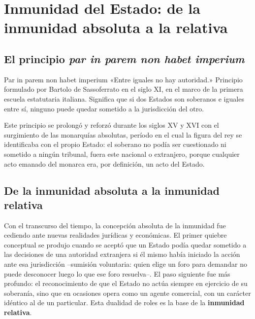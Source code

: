 \documentclass[12pt,oneside]{book}
\renewcommand{\chaptermark}[1]{\markboth{\thechapter.\ #1}{}}
\begin{document}
\chapter{Inmunidad del Estado: de la inmunidad absoluta a la relativa}
\chaptermark{Inmunidad del Estado}

\section{El principio \emph{par in parem non habet imperium}}

\begin{definicion}{Par in parem non habet imperium}
«Entre iguales no hay autoridad.» Principio formulado por Bartolo de Sassoferrato en el siglo XI, en el marco de la primera escuela estatutaria italiana. Significa que si dos Estados son soberanos e iguales entre sí, ninguno puede quedar sometido a la jurisdicción del otro.
\end{definicion}

Este principio se prolongó y reforzó durante los siglos XV y XVI con el surgimiento de las monarquías absolutas, período en el cual la figura del rey se identificaba con el propio Estado: el soberano no podía ser cuestionado ni sometido a ningún tribunal, fuera este nacional o extranjero, porque cualquier acto emanado del monarca era, por definición, un acto del Estado.

\section{De la inmunidad absoluta a la inmunidad relativa}

Con el transcurso del tiempo, la concepción absoluta de la inmunidad fue cediendo ante nuevas realidades jurídicas y económicas. El primer quiebre conceptual se produjo cuando se aceptó que un Estado podía quedar sometido a las decisiones de una autoridad extranjera si él mismo había iniciado la acción ante esa jurisdicción --sumisión voluntaria: quien elige un foro para demandar no puede desconocer luego lo que ese foro resuelva--. El paso siguiente fue más profundo: el reconocimiento de que el Estado no actúa siempre en ejercicio de su soberanía, sino que en ocasiones opera como un agente comercial, con un carácter idéntico al de un particular. Esta dualidad de roles es la base de la \textbf{inmunidad relativa}.
\end{document}
